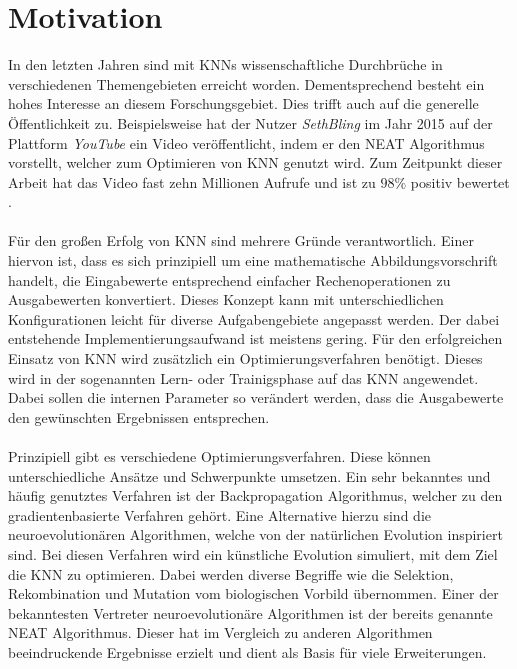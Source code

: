 \chapter{Motivation}
In den letzten Jahren sind mit \acp{KNN} wissenschaftliche Durchbrüche in verschiedenen Themengebieten erreicht worden. Dementsprechend besteht ein hohes Interesse an diesem Forschungsgebiet. Dies trifft auch auf die generelle Öffentlichkeit zu. Beispielsweise hat der Nutzer \emph{SethBling} im Jahr 2015 auf der Plattform \emph{YouTube} ein Video veröffentlicht, indem er den \ac{NEAT} Algorithmus vorstellt, welcher zum Optimieren von \ac{KNN} genutzt wird. Zum Zeitpunkt dieser Arbeit hat das Video fast zehn Millionen Aufrufe und ist zu $98\%$ positiv bewertet \cite{bling2015MarIO}. 
\\\\
Für den großen Erfolg von \ac{KNN} sind mehrere Gründe verantwortlich. Einer hiervon ist, dass es sich prinzipiell um eine mathematische Abbildungsvorschrift handelt, die Eingabewerte entsprechend einfacher Rechenoperationen zu Ausgabewerten konvertiert. Dieses Konzept kann mit unterschiedlichen Konfigurationen leicht für diverse Aufgabengebiete angepasst werden. Der dabei entstehende Implementierungsaufwand ist meistens gering. Für den erfolgreichen Einsatz von \ac{KNN} wird zusätzlich ein Optimierungsverfahren benötigt. Dieses wird in der sogenannten Lern- oder Trainigsphase auf das \ac{KNN} angewendet. Dabei sollen die internen Parameter so verändert werden, dass die Ausgabewerte den gewünschten Ergebnissen entsprechen. 
\\\\
Prinzipiell gibt es verschiedene Optimierungsverfahren. Diese können unterschiedliche Ansätze und Schwerpunkte umsetzen. Ein sehr bekanntes und häufig genutztes Verfahren ist der Backpropagation Algorithmus, welcher zu den gradientenbasierte Verfahren gehört. Eine Alternative hierzu sind die neuroevolutionären Algorithmen, welche von der natürlichen Evolution inspiriert sind. Bei diesen Verfahren wird ein künstliche Evolution simuliert, mit dem Ziel die \ac{KNN} zu optimieren. Dabei werden diverse Begriffe wie die Selektion, Rekombination und Mutation vom biologischen Vorbild übernommen. Einer der bekanntesten Vertreter neuroevolutionäre Algorithmen ist der bereits genannte \ac{NEAT} Algorithmus. Dieser hat im Vergleich zu anderen Algorithmen beeindruckende Ergebnisse erzielt und dient als Basis für viele Erweiterungen.

